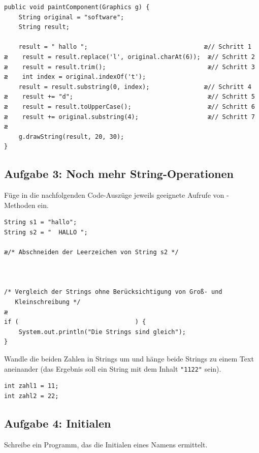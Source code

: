\begin{lstlisting}
public void paintComponent(Graphics g) {
    String original = "software";
    String result;

    result = " hallo ";                                æ// Schritt 1
æ    result = result.replace('l', original.charAt(6));  æ// Schritt 2
æ    result = result.trim();                            æ// Schritt 3
æ    int index = original.indexOf('t');
    result = result.substring(0, index);               æ// Schritt 4
æ    result += "d";                                     æ// Schritt 5
æ    result = result.toUpperCase();                     æ// Schritt 6
æ    result += original.substring(4);                   æ// Schritt 7
æ
    g.drawString(result, 20, 30);
}
\end{lstlisting}


\subsection{Aufgabe 3: Noch mehr String-Operationen}

Füge in die nachfolgenden Code-Auszüge jeweils geeignete Aufrufe von
-Methoden ein.

\begin{compactenum}[a)]
\item
\begin{lstlisting}
String s1 = "hallo";
String s2 = "  HALLO ";

æ/* Abschneiden der Leerzeichen von String s2 */



/* Vergleich der Strings ohne Berücksichtigung von Groß- und    
   Kleinschreibung */
æ
if (								) {
    System.out.println("Die Strings sind gleich");
}
\end{lstlisting}

\item Wandle die beiden Zahlen in Strings um und hänge beide Strings zu
einem Text aneinander (das Ergebnis soll ein String mit dem Inhalt \texttt{"1122"} sein). 
\begin{lstlisting}
int zahl1 = 11;
int zahl2 = 22;
\end{lstlisting}
\end{compactenum}


\subsection{Aufgabe 4: Initialen}

Schreibe ein Programm, das die Initialen eines Namens ermittelt. 

